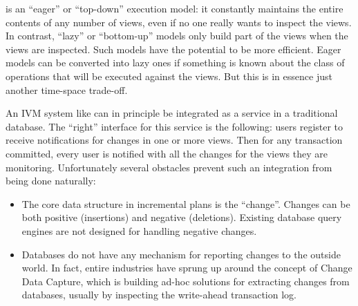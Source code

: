\dbsp is an ``eager'' or ``top-down'' execution model: it constantly
maintains the entire contents of any number of views, even if no one
really wants to inspect the views.  In contrast, ``lazy'' or
``bottom-up'' models only build part of the views when the views are
inspected.  Such models have the potential to be more efficient.
Eager models can be converted into lazy ones if something is known
about the class of operations that will be executed against the views.
But this is in essence just another time-space trade-off.

An IVM system like \dbsp can in principle be integrated as a service
in a traditional database.  The ``right'' interface for this service
is the following: users register to receive notifications for changes
in one or more views.  Then for any transaction committed, every user
is notified with all the changes for the views they are monitoring.
Unfortunately several obstacles prevent such an integration from being
done naturally:
\begin{itemize}
  \item The core data structure in incremental plans is the
    ``change''.  Changes can be both positive (insertions) and
    negative (deletions).  Existing database query engines are not
    designed for handling negative changes.
  \item Databases do not have any mechanism for reporting changes to
    the outside world.  In fact, entire industries have sprung up
    around the concept of Change Data Capture, which is building
    ad-hoc solutions for extracting changes from databases, usually by
    inspecting the write-ahead transaction log.
\end{itemize}

